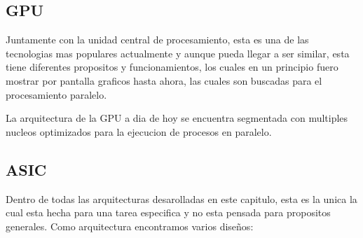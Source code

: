 \documentclass[11pt,spanish,listoffigures,listoftables]{tfgetsinf}
\begin{document}
   \subsection{GPU}

      Juntamente con la unidad central de procesamiento, esta es una de las
      tecnologias mas populares actualmente y aunque pueda llegar a ser similar,
      esta tiene diferentes propositos y funcionamientos, los cuales en un
      principio fuero mostrar por pantalla graficos hasta ahora, las cuales son
      buscadas para el procesamiento paralelo.

      La arquitectura de la GPU a dia de hoy se encuentra segmentada con
      multiples nucleos optimizados para la ejecucion de procesos en paralelo.

   \subsection{ASIC}

     Dentro de todas las arquitecturas desarolladas en este capitulo, esta es la
     unica la cual esta hecha para una tarea especifica y no esta pensada para 
     propositos generales. Como arquitectura encontramos varios diseños:
\end{document}
